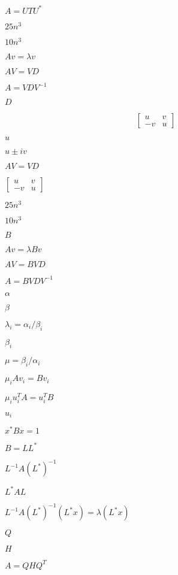 \documentclass{article}
\begin{document}
$ A = U T U^*$
\pagebreak

$25n^3$
\pagebreak

$10n^3$
\pagebreak

$ Av = \lambda v $
\pagebreak

$ A V =
V D $
\pagebreak

$ A = V D V^{-1} $
\pagebreak

$ D
$
\pagebreak

\[ \begin{bmatrix} u & v \\ -v & u \end{bmatrix} \]
\pagebreak

$ u $
\pagebreak

$ u \pm iv $
\pagebreak

$ AV = VD $
\pagebreak

$ \begin{bmatrix} u & v \\ -v & u \end{bmatrix} $
\pagebreak

$ 25n^3 $
\pagebreak

$ 10n^3 $
\pagebreak

$ B $
\pagebreak

$ Av = \lambda Bv $
\pagebreak

$ A V =
B V D $
\pagebreak

$ A = B V D V^{-1} $
\pagebreak

$ \alpha $
\pagebreak

$ \beta $
\pagebreak

$ \lambda_i = \alpha_i / \beta_i $
\pagebreak

$ \beta_i $
\pagebreak

$ \mu = \beta_i / \alpha_i$
\pagebreak

$ \mu_i A v_i = B v_i $
\pagebreak

$ \mu_i u_i^T A  = u_i^T B $
\pagebreak

$ u_i $
\pagebreak

$ x^* B x = 1 $
\pagebreak

$ B = LL^* $
\pagebreak

$ L^{-1} A (L^*)^{-1} $
\pagebreak

$ L^{*} A L $
\pagebreak

$ L^{-1} A (L^*)^{-1} (L^* x) = \lambda (L^* x) $
\pagebreak

$ Q $
\pagebreak

$ H $
\pagebreak

$ A = Q H
Q^T $
\pagebreak
\end{document}
